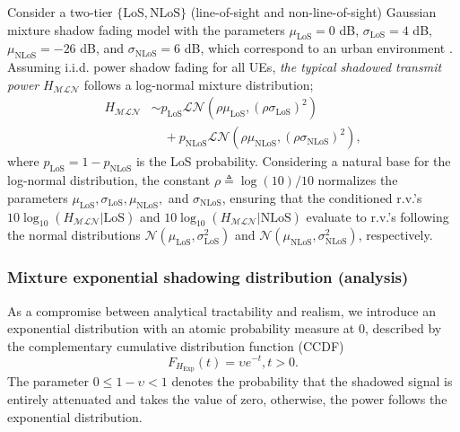 \documentclass[lettersize,journal]{IEEEtran}
\begin{document}
Consider a two-tier $\{\text{LoS},\text{NLoS}\}$ (line-of-sight and non-line-of-sight) Gaussian mixture shadow fading model with the parameters $\mu_{\text{LoS}} = 0$ dB, $\sigma_{\text{LoS}} = 4$ dB, $\mu_{\text{NLoS}} = -26$ dB, and $\sigma_{\text{NLoS}} = 6$ dB, which correspond to an urban environment \cite{TR38.811}. Assuming i.i.d. power shadow fading for all UEs, \textit{the typical shadowed transmit power} $H_{\mathcal{M}\mathcal{L}\mathcal{N}}$ follows a log-normal mixture distribution;
\begin{align}
  \label{eq:tier2lognormal}
  H_{\mathcal{M}\mathcal{L}\mathcal{N}} &\sim p_{\text{LoS}} \mathcal{L}\mathcal{N}(\rho \mu_{\text{LoS}}, (\rho \sigma_{\text{LoS}})^2) \nonumber \\
  &\quad + p_{\text{NLoS}} \mathcal{L}\mathcal{N}(\rho \mu_{\text{NLoS}}, (\rho \sigma_{\text{NLoS}})^2),
\end{align}
where $p_{\text{LoS}}=1-p_{\text{NLoS}}$ is the LoS probability. Considering a natural base for the log-normal distribution, the constant $\rho \triangleq \log(10)/10$ normalizes the parameters $\mu_{\text{LoS}}, \sigma_{\text{LoS}}, \mu_{\text{NLoS}},$ and $\sigma_{\text{NLoS}}$, ensuring that the conditioned r.v.'s $10 \log_{10}(H_{\mathcal{MLN}}|\text{LoS})$ and $10 \log_{10}(H_{\mathcal{MLN}}|\text{NLoS})$ evaluate to r.v.'s following the normal distributions $\mathcal{N}(\mu_{\text{LoS}}, \sigma_{\text{LoS}}^2)$ and $\mathcal{N}(\mu_{\text{NLoS}}, \sigma_{\text{NLoS}}^2)$, respectively.



\subsubsection{Mixture exponential shadowing distribution (analysis)}
As a compromise between analytical tractability and realism, we introduce an exponential distribution with an atomic probability measure at $0$, described by the complementary cumulative distribution function (CCDF)
\begin{equation}
  \label{eq:defexp}
  F_{{H}_{\text{Exp}}}(t) = \upsilon e^{-t}, t>0.
\end{equation}
 The parameter $0 \leq 1-\upsilon < 1$ denotes the probability that the shadowed signal is entirely attenuated and takes the value of zero, otherwise, the power follows the exponential distribution. 
\end{document}
